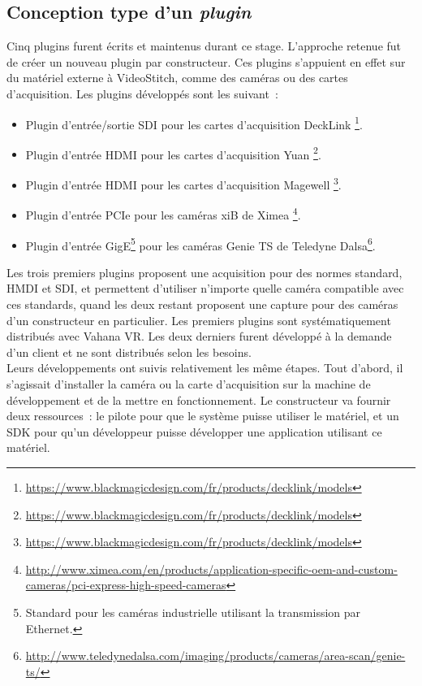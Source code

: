 \subsection{Conception type d'un \textit{plugin}}
Cinq plugins furent écrits et maintenus durant ce stage. L'approche retenue fut de créer
un nouveau plugin par constructeur. Ces plugins s'appuient en effet sur du matériel
externe à VideoStitch, comme des caméras ou des cartes d'acquisition. Les plugins
développés sont les suivant~:
\begin{itemize}
  \item Plugin d'entrée/sortie SDI pour les cartes d'acquisition DeckLink
  \footnote{\url{https://www.blackmagicdesign.com/fr/products/decklink/models}}.
  \item Plugin d'entrée HDMI pour les cartes d'acquisition Yuan
  \footnote{\url{https://www.blackmagicdesign.com/fr/products/decklink/models}}.
  \item Plugin d'entrée HDMI pour les cartes d'acquisition Magewell
  \footnote{\url{https://www.blackmagicdesign.com/fr/products/decklink/models}}.
  \item Plugin d'entrée PCIe pour les caméras xiB de Ximea
  \footnote{\url{http://www.ximea.com/en/products/application-specific-oem-and-custom-cameras/pci-express-high-speed-cameras}}.
  \item Plugin d'entrée GigE\footnote{Standard pour les caméras industrielle utilisant 
  la transmission par Ethernet\cite{gige}.} pour les caméras Genie TS de Teledyne Dalsa\footnote{\url{http://www.teledynedalsa.com/imaging/products/cameras/area-scan/genie-ts/}}.
\end{itemize}
Les trois premiers plugins proposent une acquisition pour des normes standard, HMDI et SDI, 
et permettent d'utiliser n'importe quelle caméra compatible avec ces standards, quand les
deux restant proposent une capture pour des caméras d'un constructeur en particulier.
Les premiers plugins sont systématiquement distribués avec Vahana VR. Les deux derniers
furent développé à la demande d'un client et ne sont distribués selon les besoins.\\
\newline
Leurs développements ont suivis relativement les même étapes.
Tout d'abord, il s'agissait d'installer la caméra ou la carte d'acquisition sur la 
machine de développement et de la mettre en fonctionnement. Le constructeur va fournir
deux ressources~: le pilote pour que le système puisse utiliser le matériel, et un
SDK pour qu'un développeur puisse développer une application utilisant ce matériel.
